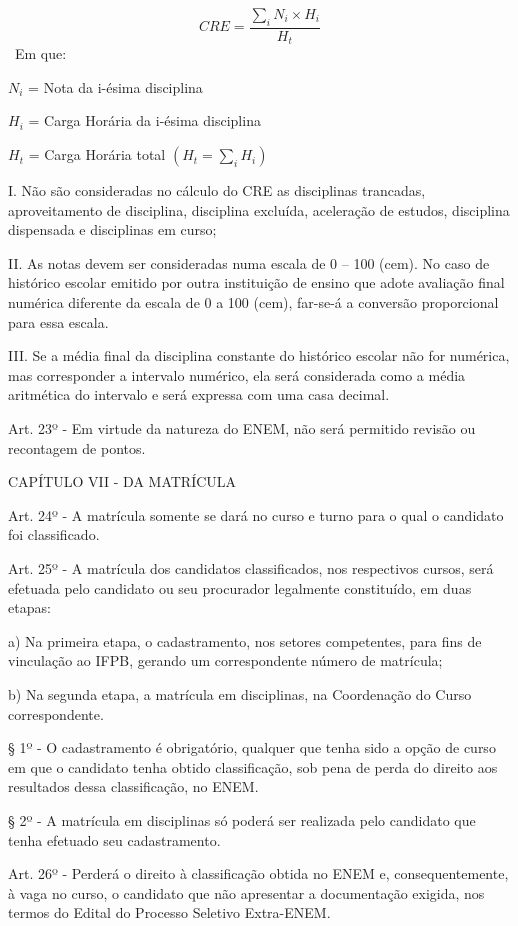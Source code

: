 $$
CRE = \frac{\sum_{i} N_i \times H_i}{H_t}
$$
~Em que:

$N_i$ = Nota da i-\'esima disciplina

$H_i$ = Carga Horária da i-\'esima disciplina

$H_t$ = Carga Hor\'aria total $(H_t = \sum_{i} H_i)$

I. Não são consideradas no cálculo do CRE as disciplinas trancadas, aproveitamento de disciplina, disciplina excluída, aceleração de estudos, disciplina dispensada e disciplinas em curso;

II. As notas devem ser consideradas numa escala de 0 – 100 (cem). No caso de histórico escolar emitido por outra instituição de ensino que adote avaliação final numérica diferente da escala de 0 a 100 (cem), far-se-á a conversão proporcional para essa escala.

III. Se a média final da disciplina constante do histórico escolar não for numérica, mas corresponder a intervalo numérico, ela será considerada como a média aritmética do intervalo e será expressa com uma casa decimal.

Art. 23º - Em virtude da natureza do ENEM, não será permitido revisão ou recontagem de pontos.


CAPÍTULO VII - DA MATRÍCULA



Art. 24º - A matrícula somente se dará no curso e turno para o qual o candidato foi classificado.

Art. 25º - A matrícula dos candidatos classificados, nos respectivos cursos, será efetuada pelo candidato ou seu procurador legalmente constituído, em duas etapas:

a) Na primeira etapa, o cadastramento, nos setores competentes, para fins de vinculação ao IFPB, gerando um correspondente número de matrícula;

b) Na segunda etapa, a matrícula em disciplinas, na Coordenação do Curso correspondente.

§ 1º - O cadastramento é obrigatório, qualquer que tenha sido a opção de curso em que o candidato tenha obtido classificação, sob pena de perda do direito aos resultados dessa classificação, no ENEM.

§ 2º - A matrícula em disciplinas só poderá ser realizada pelo candidato que tenha efetuado seu cadastramento.

Art. 26º - Perderá o direito à classificação obtida no ENEM e, consequentemente, à vaga no curso, o candidato que não apresentar a documentação exigida, nos termos do Edital do Processo Seletivo Extra-ENEM.

